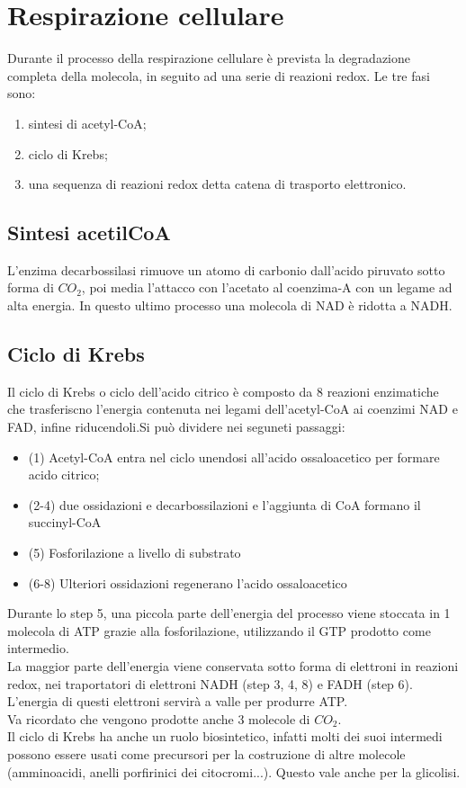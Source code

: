 \section{Respirazione cellulare}
Durante il processo della respirazione cellulare \`e prevista la degradazione completa della molecola, in seguito ad una serie di reazioni redox. Le tre fasi sono: 
\begin{enumerate}
    \item sintesi di acetyl-CoA;
    \item ciclo di Krebs; 
    \item una sequenza di reazioni redox detta catena di trasporto elettronico.
\end{enumerate}
\subsection{Sintesi acetilCoA}
L'enzima decarbossilasi rimuove un atomo di carbonio dall'acido piruvato sotto forma di $CO_2$, poi media l'attacco con l'acetato al coenzima-A con un legame ad alta energia. In questo ultimo processo una molecola di NAD\ap{+} \`e ridotta a NADH.
\subsection{Ciclo di Krebs}
Il ciclo di Krebs o ciclo dell'acido citrico \`e composto da 8 reazioni enzimatiche che trasferiscno l'energia contenuta nei legami dell'acetyl-CoA ai coenzimi NAD e FAD, infine riducendoli.Si pu\`o dividere nei seguneti passaggi:
\begin{itemize}
    \item (1) Acetyl-CoA entra nel ciclo unendosi all'acido ossaloacetico per formare acido citrico;
    \item (2-4) due ossidazioni e decarbossilazioni e l'aggiunta di CoA formano il succinyl-CoA
    \item (5) Fosforilazione a livello di substrato
    \item (6-8) Ulteriori ossidazioni regenerano l'acido ossaloacetico
\end{itemize}
Durante lo step 5, una piccola parte dell'energia del processo viene stoccata in 1 molecola di ATP grazie alla fosforilazione, utilizzando il GTP prodotto come intermedio.
\\La maggior parte dell'energia viene conservata sotto forma di elettroni in reazioni redox, nei traportatori di elettroni NADH (step 3, 4, 8) e FADH (step 6). L'energia di questi elettroni servir\`a a valle per produrre ATP.
\\Va ricordato che vengono prodotte anche 3 molecole di $CO_2$. 
\\Il ciclo di Krebs ha anche un ruolo biosintetico, infatti molti dei suoi intermedi possono essere usati come precursori per la costruzione di altre molecole (amminoacidi, anelli porfirinici dei citocromi...). Questo vale anche per la glicolisi. 
